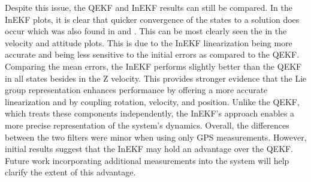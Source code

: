 Despite this issue, the QEKF and InEKF results can still be compared. In the InEKF plots, it is clear that quicker convergence of the states to a solution does occur which was also found in \cite{Contact-Aided_Invarant_EKF} and \cite{9444664}. This can be most clearly seen the in the velocity and attitude plots. This is due to the InEKF linearization being more accurate and being less sensitive to the initial errors as compared to the QEKF. Comparing the mean errors, the InEKF performs slightly better than the QEKF in all states besides in the Z velocity. This provides stronger evidence that the Lie group representation enhances performance by offering a more accurate linearization and by coupling rotation, velocity, and position. Unlike the QEKF, which treats these components independently, the InEKF’s approach enables a more precise representation of the system’s dynamics. Overall, the differences between the two filters were minor when using only GPS measurements. However, initial results suggest that the InEKF may hold an advantage over the QEKF. Future work incorporating additional measurements into the system will help clarify the extent of this advantage.


